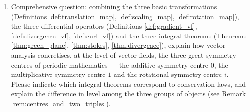 \begin{enumerate}[leftmargin=3em, label=\textbf{Exercise \arabic*}]
    \item Comprehensive question: combining the three basic transformations (Definitions \ref{def:translation_map}, \ref{def:scaling_map},
    \ref{def:rotation_map}), the three differential operators (Definitions \ref{def:gradient_vf},
    \ref{def:divergence_vf}, \ref{def:curl_vf})
    and the three integral theorems (Theorems \ref{thm:green_plane}, \ref{thm:stokes}, \ref{thm:divergence}),
    explain how vector analysis concretises, at the level of vector fields, the three great symmetry centres of periodic mathematics --- the additive symmetry centre $0$,
    the multiplicative symmetry centre $1$ and the rotational symmetry centre $i$.
    Please indicate which integral theorems correspond to conservation laws, and explain the difference in level among the three groups of objects
    (see Remark \ref{rem:centres_and_two_triples}).
\end{enumerate}
